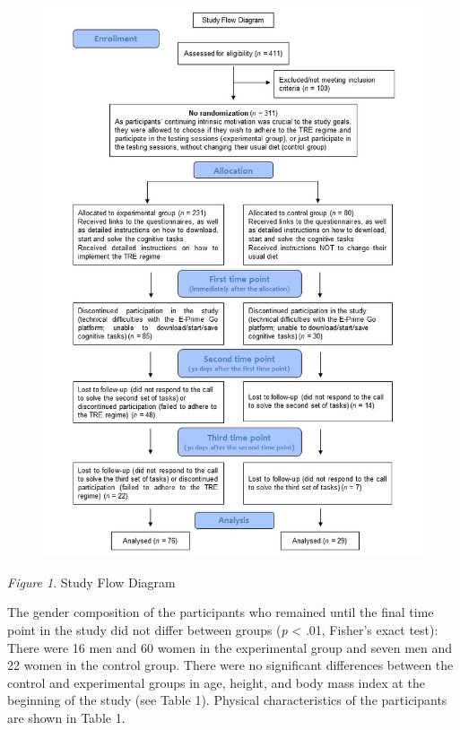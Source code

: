 \documentclass[authordate, empirical]{jote-new-article}
\begin{document}
\begin{figure}
  \includegraphics[width=\linewidth]{media/image1.jpg}

  \caption{}

  \label{fig:rId8}


\end{figure}



\emph{Figure 1}. Study Flow Diagram







The gender composition of the participants who remained until the final time point in the study did not differ between groups (\emph{p }< .01, Fisher's exact test): There were 16 men and 60 women in the experimental group and seven men and 22 women in the control group. There were no significant differences between the control and experimental groups in age, height, and body mass index at the beginning of the study (see Table 1). Physical characteristics of the participants are shown in Table 1.
\end{document}
